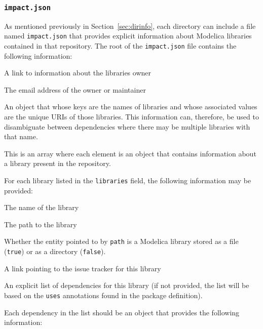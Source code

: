 \documentclass[11pt,a4paper,twocolumn]{article}
\newcommand{\code}[1]{\texttt{#1}} %
\begin{document}
\subsubsection{\code{impact.json}}
\label{sec:dirinfo_schema}

As mentioned previously in Section~\ref{sec:dirinfo}, each directory
can include a file named \code{impact.json} that provides explicit
information about Modelica libraries contained in that repository.
The root of the \code{impact.json} file contains the following
information:

\begin{description}[noitemsep]
  \item[\code{owner\_uri}] A link to information about the libraries
    owner
  \item[\code{email}] The email address of the owner or maintainer
  \item[\code{alias}] An object that whose keys are the names of
    libraries and whose associated values are the unique URIs of those
    libraries.  This information can, therefore, be used to
    disambiguate between dependencies where there may be multiple
    libraries with that name.
  \item[\code{libraries}] This is an array where each element is an
    object that contains information about a library present in the
    repository.
\end{description}

For each library listed in the \code{libraries} field, the following
information may be provided:

\begin{description}[noitemsep]
  \item[\code{name}] The name of the library
  \item[\code{path}] The path to the library
  \item[\code{isfile}] Whether the entity pointed to by \code{path} is
    a Modelica library stored as a file (\code{true}) or as a
    directory (\code{false}).
  \item[\code{issues\_url}] A link pointing to the issue tracker for
    this library
  \item[\code{dependencies}] An explicit list of dependencies for this
    library (if not provided, the list will be based on the
    \code{uses} annotations found in the package definition).
\end{description}

Each dependency in the list should be an object that provides the
following information:
\end{document}
